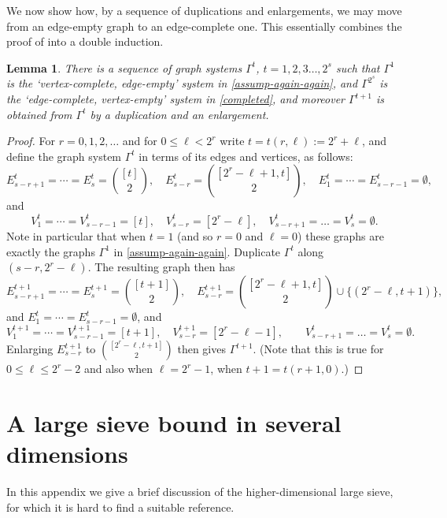 \documentclass[11pt,reqno]{amsart}
\numberwithin{equation}{section}
\newtheorem{lemma}[theorem]{Lemma}
\theoremstyle{definition}
\theoremstyle{remark}
\renewcommand{\le}{\leqslant}
\begin{document}
We now show how, by a sequence of duplications and enlargements, we may move from an edge-empty graph to an edge-complete one. This essentially combines the proof of \cite[Proposition~6.2,~Corollary~6.3]{KKL24} into a double induction.


\begin{lemma}
 There is a sequence of graph systems $\Gamma^t$, $t = 1,2,3\dots, 2^s$ such that $\Gamma^1$ is the `vertex-complete, edge-empty' system in \cref{assump-again-again}, and $\Gamma^{2^s}$ is the `edge-complete, vertex-empty' system in \cref{completed}, and moreover $\Gamma^{t+1}$ is obtained from $\Gamma^t$ by a duplication and an enlargement.   
\end{lemma}
\begin{proof} For $r = 0,1,2,\dots$ and for $0 \le \ell < 2^r$ write $t = t(r,\ell) := 2^r + \ell$, and define the graph system $\Gamma^{t}$ in terms of its edges and vertices, as follows: 
\[ E_{s - r + 1}^t = \cdots = E_s^t = \binom{[t]}{2},\quad E_{s-r}^t = \binom{[2^r - \ell + 1, t]}{2}, \quad  E_1^t = \cdots = E_{s-r - 1}^t =  \emptyset,\] and
\[ V_1^t = \cdots = V_{s - r-1}^t = [t], \quad V_{s - r}^t = [2^r - \ell], \quad V_{s-r+1}^t = \dots = V_s^t = \emptyset.\] 
Note in particular that when $t = 1$ (and so $r = 0$ and $\ell = 0$) these graphs are exactly the graphs $\Gamma^1$ in \cref{assump-again-again}.
Duplicate $\Gamma^t$ along $(s - r, 2^r - \ell)$. The resulting graph then has
\[E_{s - r + 1}^{t+1} = \cdots = E_s^{t+1} = \binom{[t+1]}{2}, \quad E_{s-r}^{t+1} = \binom{[2^r - \ell + 1, t]}{2} \cup \{ (2^r - \ell, t+1)\}, \] and $E_1^t = \cdots = E_{s-r - 1}^t =  \emptyset$, and
\[ V_{1}^{t+1} = \cdots = V_{s-r - 1}^{t+1} = [t+1],\quad V_{s-r}^{t+1} = [2^r - \ell -1] , \quad  \quad V_{s-r+1}^t = \dots = V_s^t = \emptyset.\]  Enlarging $E_{s-r}^{t+1}$ to $\binom{[2^r - \ell , t+1]}{2}$ then gives $\Gamma^{t+1}$. (Note that this is true for $0 \le \ell \le 2^r - 2$ and also when $\ell = 2^r - 1$, when $t + 1= t(r+1,0)$.)


\end{proof}




\section{A large sieve bound in several dimensions}\label{appendixC}

In this appendix we give a brief discussion of the higher-dimensional large sieve, for which it is hard to find a suitable reference. 
\end{document}
